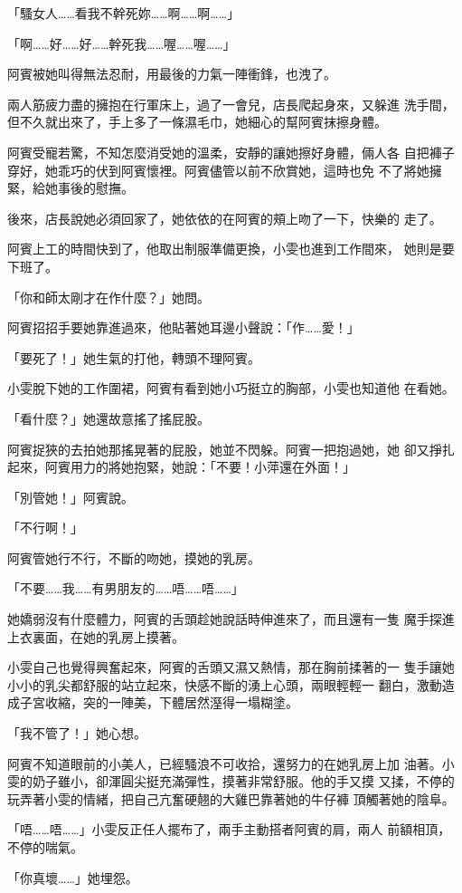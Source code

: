 「騷女人……看我不幹死妳……啊……啊……」

「啊……好……好……幹死我……喔……喔……」

阿賓被她叫得無法忍耐，用最後的力氣一陣衝鋒，也洩了。

兩人筋疲力盡的擁抱在行軍床上，過了一會兒，店長爬起身來，又躲進
洗手間，但不久就出來了，手上多了一條濕毛巾，她細心的幫阿賓抹擦身體。

阿賓受寵若驚，不知怎麼消受她的溫柔，安靜的讓她擦好身體，倆人各
自把褲子穿好，她乖巧的伏到阿賓懷裡。阿賓儘管以前不欣賞她，這時也免
不了將她擁緊，給她事後的慰撫。

後來，店長說她必須回家了，她依依的在阿賓的頰上吻了一下，快樂的
走了。

阿賓上工的時間快到了，他取出制服準備更換，小雯也進到工作間來，
她則是要下班了。

「你和師太剛才在作什麼？」她問。

阿賓招招手要她靠進過來，他貼著她耳邊小聲說：「作……愛！」

「要死了！」她生氣的打他，轉頭不理阿賓。

小雯脫下她的工作圍裙，阿賓有看到她小巧挺立的胸部，小雯也知道他
在看她。

「看什麼？」她還故意搖了搖屁股。

阿賓捉狹的去拍她那搖晃著的屁股，她並不閃躲。阿賓一把抱過她，她
卻又掙扎起來，阿賓用力的將她抱緊，她說：「不要！小萍還在外面！」

「別管她！」阿賓說。

「不行啊！」

阿賓管她行不行，不斷的吻她，摸她的乳房。

「不要……我……有男朋友的……唔……唔……」

她嬌弱沒有什麼體力，阿賓的舌頭趁她說話時伸進來了，而且還有一隻
魔手探進上衣裏面，在她的乳房上摸著。

小雯自己也覺得興奮起來，阿賓的舌頭又濕又熱情，那在胸前揉著的一
隻手讓她小小的乳尖都舒服的站立起來，快感不斷的湧上心頭，兩眼輕輕一
翻白，激動造成子宮收縮，突的一陣美，下體居然溼得一塌糊塗。

「我不管了！」她心想。

阿賓不知道眼前的小美人，已經騷浪不可收拾，還努力的在她乳房上加
油著。小雯的奶子雖小，卻渾圓尖挺充滿彈性，摸著非常舒服。他的手又摸
又揉，不停的玩弄著小雯的情緒，把自己亢奮硬翹的大雞巴靠著她的牛仔褲
頂觸著她的陰阜。

「唔……唔……」小雯反正任人擺布了，兩手主動搭者阿賓的肩，兩人
前額相頂，不停的喘氣。

「你真壞……」她埋怨。

